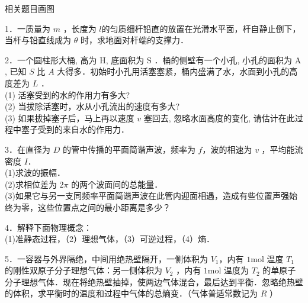
\begin{issues}
相关题目画图
\end{issues}

1．一质量为 $m$ ，长度为 $l$的匀质细杆铅直的放置在光滑水平面，杆自静止倒下，当杆与铅直线成为 $\theta$ 时，求地面对杆端的支撑力．

2．一个圆柱形大桶, 高为 $\mathrm{H}$, 底面积为 $\mathrm{S}$ ．桶的侧壁有一个小孔, 小孔的面积为 $\mathrm{A}$, 已知 $S$ 比 $A$ 大得多．初始时小孔用活塞塞紧，桶内盛满了水，水面到小孔的高度差为 $L$ ．\\
(1) 活塞受到的水的作用力有多大? \\
(2) 当拔除活塞时，水从小孔流出的速度有多大? \\
(3) 如果拔掉塞子后，马上再以速度 $v$ 塞回去, 忽略水面高度的变化, 请估计在此过程中塞子受到的来自水的作用力．

3．在直径为 $D$ 的管中传播的平面简谐声波，频率为 $f$，波的相速为 $v$ ，平均能流密度 $I$．\\
(1)求波的振幅．\\
(2)求相位差为 $2\pi$ 的两个波面间的总能量．\\
(3)如果它与另一支同频率平面简谐声波在此管内迎面相遇，造成有些位置声强始终为零，这些位置点之间的最小距离是多少？

4．解释下面物理概念：\\
(1)准静态过程，（2）理想气体，（3）可逆过程，（4）熵．

5．一容器与外界隔绝，中间用绝热壁隔开，一侧体积为 $V_1$，内有 $1\mathrm{mol}$ 温度 $T_1$ 的刚性双原子分子理想气体：另一侧体积为 $V_2$ ，内有 $1\mathrm{mol}$ 温度为 $T_2$ 的单原子分子理想气体．现在将绝热壁抽掉，使两边气体混合，最后达到平衡．忽略绝热壁的体积，求平衡时的温度和过程中气体的总熵变．（气体普适常数记为 $R$ ）


